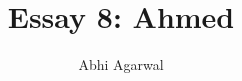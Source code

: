 \documentclass[11pt, oneside]{article}
\title{Essay 8: Ahmed}
\author{Abhi Agarwal}
\date{}
\begin{document}
\maketitle

\par 
\end{document}
